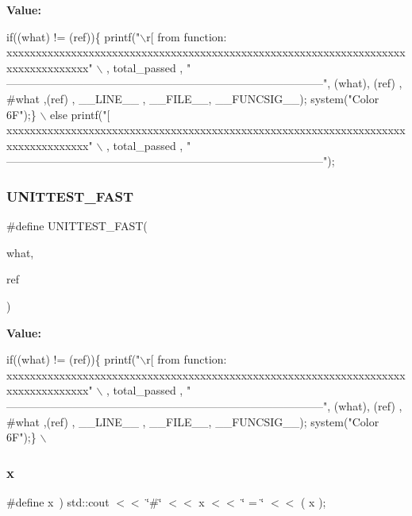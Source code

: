{\bfseries Value\+:}
\begin{DoxyCode}
\textcolor{keywordflow}{if}((what) != (ref))\{ printf(\textcolor{stringliteral}{"\(\backslash\)r[%
       from function: %
      xxxxxxxxxxxxxxxxxxxxxxxxxxxxxxxxxxxxxxxxxxxxxxxxxxxxxxxxxxxxxxxxxxxxxxxxxxxxxxxxxx"} \(\backslash\)
       , total\_passed , \textcolor{stringliteral}{"
      --------------------------------------------------------------------------------------"}, (what), (ref) , #what ,(ref) , \_\_LINE\_\_ , \_\_FILE\_\_, \_\_FUNCSIG\_\_); system(\textcolor{stringliteral}{"Color 6F"});\} \(\backslash\)
   else printf(\textcolor{stringliteral}{"[%
      xxxxxxxxxxxxxxxxxxxxxxxxxxxxxxxxxxxxxxxxxxxxxxxxxxxxxxxxxxxxxxxxxxxxxxxxxxxxxxxxxx"} \(\backslash\)
       , total\_passed , \textcolor{stringliteral}{"
      --------------------------------------------------------------------------------------"});
\end{DoxyCode}
\mbox{\label{unittest_8h_a765e2e481346be6219983cafa32ad825}} 
\subsubsection{U\+N\+I\+T\+T\+E\+S\+T\+\_\+\+F\+A\+ST}
{\footnotesize\ttfamily \#define U\+N\+I\+T\+T\+E\+S\+T\+\_\+\+F\+A\+ST(\begin{DoxyParamCaption}\item[{}]{what,  }\item[{}]{ref }\end{DoxyParamCaption})}

{\bfseries Value\+:}
\begin{DoxyCode}
\textcolor{keywordflow}{if}((what) != (ref))\{ printf(\textcolor{stringliteral}{"\(\backslash\)r[%
       from function: %
      xxxxxxxxxxxxxxxxxxxxxxxxxxxxxxxxxxxxxxxxxxxxxxxxxxxxxxxxxxxxxxxxxxxxxxxxxxxxxxxxxx"} \(\backslash\)
       , total\_passed , \textcolor{stringliteral}{"
      --------------------------------------------------------------------------------------"}, (what), (ref) , #what ,(ref) , \_\_LINE\_\_ , \_\_FILE\_\_, \_\_FUNCSIG\_\_); system(\textcolor{stringliteral}{"Color 6F"});\} \(\backslash\)
\end{DoxyCode}
\mbox{\label{unittest_8h_a6c4b361d72eb3767ba424ac9a6ecf52b}} 
\subsubsection{x}
{\footnotesize\ttfamily \#define x~) std\+::cout $<$$<$ \char`\"{}\#\char`\"{} $<$$<$ x $<$$<$ \char`\"{} = \char`\"{} $<$$<$ ( x );}

